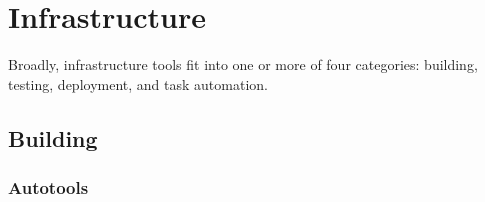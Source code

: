 \chapter{Infrastructure}\label{chap:infrastructure}




Broadly, infrastructure tools fit into one or more of four categories:
building, testing, deployment, and task automation.


\section{Building}


\cite{kelly2002optimization}


\subsection{Autotools}



